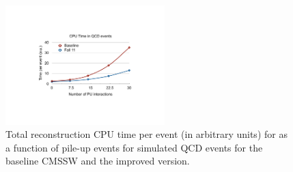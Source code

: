 \begin{figure}[t]
\includegraphics*[width=0.55\textwidth]{figs/recotime_vs_pu.pdf}\hspace{0.02\textwidth}%
\begin{minipage}[b]{0.38\textwidth}\caption{\label{fig:fall11vsPU}Total reconstruction CPU time per event (in arbitrary units)
  for as a function of pile-up events for simulated QCD
  events for the baseline CMSSW and the 
improved version.}
\end{minipage}
\end{figure}

